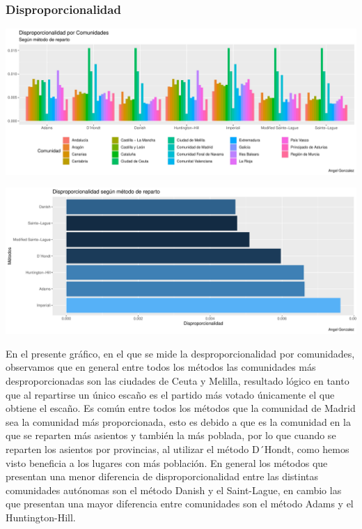 \documentclass[12pt,a4paper,]{book}
\numberwithin{dummy}{section}
\theoremstyle{ocrenumbox}
\theoremstyle{blacknumex}
\theoremstyle{blacknumbox}
\theoremstyle{ocrenum}
\theoremstyle{ocrenum}
\begin{document}
\hypertarget{disproporcionalidad}{%
\subsubsection{Disproporcionalidad}\label{disproporcionalidad}}

\begin{center}\includegraphics[width=0.95\linewidth]{figurasR/unnamed-chunk-60-1} \end{center}

\begin{center}\includegraphics[width=0.95\linewidth]{figurasR/unnamed-chunk-60-2} \end{center}

En el presente gráfico, en el que se mide la desproporcionalidad por
comunidades, observamos que en general entre todos los métodos las
comunidades más desproporcionadas son las ciudades de Ceuta y Melilla,
resultado lógico en tanto que al repartirse un único escaño es el
partido más votado únicamente el que obtiene el escaño. Es común entre
todos los métodos que la comunidad de Madrid sea la comunidad más
proporcionada, esto es debido a que es la comunidad en la que se
reparten más asientos y también la más poblada, por lo que cuando se
reparten los asientos por provincias, al utilizar el método D´Hondt,
como hemos visto beneficia a los lugares con más población. En general
los métodos que presentan una menor diferencia de disproporcionalidad
entre las distintas comunidades autónomas son el método Danish y el
Saint-Lague, en cambio las que presentan una mayor diferencia entre
comunidades son el método Adams y el Huntington-Hill.
\end{document}
